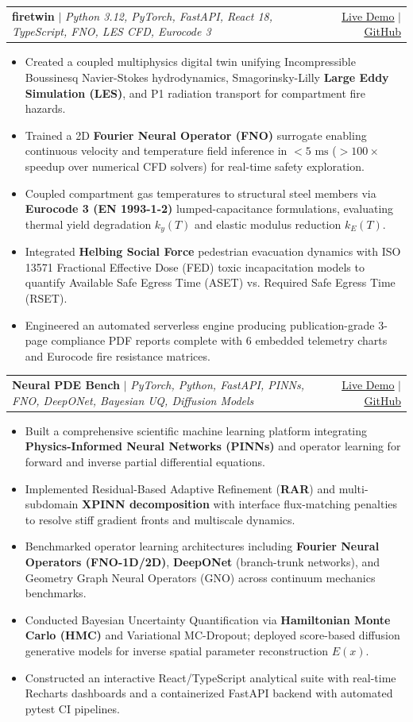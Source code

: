 \documentclass[letterpaper,10.8pt]{article}
\makeatletter
\newcommand{\resumeItem}[1]{
  \item\small{
    {#1 \vspace{-1.5pt}}
  }
}
\newcommand{\resumeProjectHeading}[2]{
    \vspace{-1pt}\item
    \begin{tabular*}{0.98\textwidth}[t]{l@{\extracolsep{\fill}}r}
      #1 & #2 \\
    \end{tabular*}\vspace{-5pt}
}
\newcommand{\resumeItemListStart}{\begin{itemize}[leftmargin=0.15in, label={\raisebox{0.2ex}{\tiny$\bullet$}}]}
\newcommand{\resumeItemListEnd}{\end{itemize}\vspace{-4pt}}
\makeatother
\begin{document}
      \resumeProjectHeading
          {\textbf{firetwin} $|$ \emph{Python 3.12, PyTorch, FastAPI, React 18, TypeScript, FNO, LES CFD, Eurocode 3}}
          {\href{https://firetwin.vercel.app}{\underline{Live Demo}} $|$ \href{https://github.com/10tan/firetwin}{\underline{GitHub}}}
          \resumeItemListStart
            \resumeItem{Created a coupled multiphysics digital twin unifying Incompressible Boussinesq Navier-Stokes hydrodynamics, Smagorinsky-Lilly \textbf{Large Eddy Simulation (LES)}, and P1 radiation transport for compartment fire hazards.}
            \resumeItem{Trained a 2D \textbf{Fourier Neural Operator (FNO)} surrogate enabling continuous velocity and temperature field inference in \textbf{$<5\text{ ms}$} ($>100\times$ speedup over numerical CFD solvers) for real-time safety exploration.}
            \resumeItem{Coupled compartment gas temperatures to structural steel members via \textbf{Eurocode 3 (EN 1993-1-2)} lumped-capacitance formulations, evaluating thermal yield degradation $k_y(T)$ and elastic modulus reduction $k_E(T)$.}
            \resumeItem{Integrated \textbf{Helbing Social Force} pedestrian evacuation dynamics with ISO 13571 Fractional Effective Dose (FED) toxic incapacitation models to quantify Available Safe Egress Time (ASET) vs. Required Safe Egress Time (RSET).}
            \resumeItem{Engineered an automated serverless engine producing publication-grade 3-page compliance PDF reports complete with 6 embedded telemetry charts and Eurocode fire resistance matrices.}
          \resumeItemListEnd

      \resumeProjectHeading
          {\textbf{Neural PDE Bench} $|$ \emph{PyTorch, Python, FastAPI, PINNs, FNO, DeepONet, Bayesian UQ, Diffusion Models}}
          {\href{https://neural-pde-bench.vercel.app}{\underline{Live Demo}} $|$ \href{https://github.com/10tan/neural-pde-bench}{\underline{GitHub}}}
          \resumeItemListStart
            \resumeItem{Built a comprehensive scientific machine learning platform integrating \textbf{Physics-Informed Neural Networks (PINNs)} and operator learning for forward and inverse partial differential equations.}
            \resumeItem{Implemented Residual-Based Adaptive Refinement (\textbf{RAR}) and multi-subdomain \textbf{XPINN decomposition} with interface flux-matching penalties to resolve stiff gradient fronts and multiscale dynamics.}
            \resumeItem{Benchmarked operator learning architectures including \textbf{Fourier Neural Operators (FNO-1D/2D)}, \textbf{DeepONet} (branch-trunk networks), and Geometry Graph Neural Operators (GNO) across continuum mechanics benchmarks.}
            \resumeItem{Conducted Bayesian Uncertainty Quantification via \textbf{Hamiltonian Monte Carlo (HMC)} and Variational MC-Dropout; deployed score-based diffusion generative models for inverse spatial parameter reconstruction $E(x)$.}
            \resumeItem{Constructed an interactive React/TypeScript analytical suite with real-time Recharts dashboards and a containerized FastAPI backend with automated pytest CI pipelines.}
          \resumeItemListEnd
\end{document}
